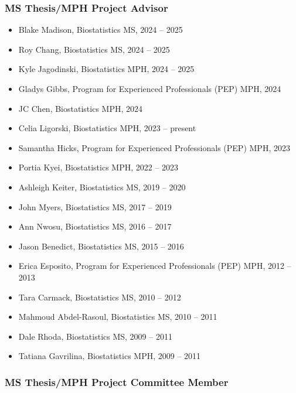 \documentclass[
  english,
  letterpaper,
  DIV=11,
  numbers=noendperiod]{scrartcl}
\providecommand{\tightlist}{%
  \setlength{\itemsep}{0pt}\setlength{\parskip}{0pt}}
\begin{document}
\subsubsection{MS Thesis/MPH Project
Advisor}\label{ms-thesismph-project-advisor}

\begin{itemize}
\tightlist
\item
  Blake Madison, Biostatistics MS, 2024 -- 2025
\item
  Roy Chang, Biostatistics MS, 2024 -- 2025
\item
  Kyle Jagodinski, Biostatistics MPH, 2024 -- 2025
\item
  Gladys Gibbs, Program for Experienced Professionals (PEP) MPH, 2024
\item
  JC Chen, Biostatistics MPH, 2024
\item
  Celia Ligorski, Biostatistics MPH, 2023 -- present
\item
  Samantha Hicks, Program for Experienced Professionals (PEP) MPH, 2023
\item
  Portia Kyei, Biostatistics MPH, 2022 -- 2023
\item
  Ashleigh Keiter, Biostatistics MS, 2019 -- 2020
\item
  John Myers, Biostatistics MS, 2017 -- 2019
\item
  Ann Nwosu, Biostatistics MS, 2016 -- 2017
\item
  Jason Benedict, Biostatistics MS, 2015 -- 2016
\item
  Erica Esposito, Program for Experienced Professionals (PEP) MPH, 2012
  -- 2013
\item
  Tara Carmack, Biostatistics MS, 2010 -- 2012
\item
  Mahmoud Abdel-Rasoul, Biostatistics MS, 2010 -- 2011
\item
  Dale Rhoda, Biostatistics MS, 2009 -- 2011
\item
  Tatiana Gavrilina, Biostatistics MPH, 2009 -- 2011
\end{itemize}

\subsubsection{MS Thesis/MPH Project Committee
Member}\label{ms-thesismph-project-committee-member}
\end{document}
